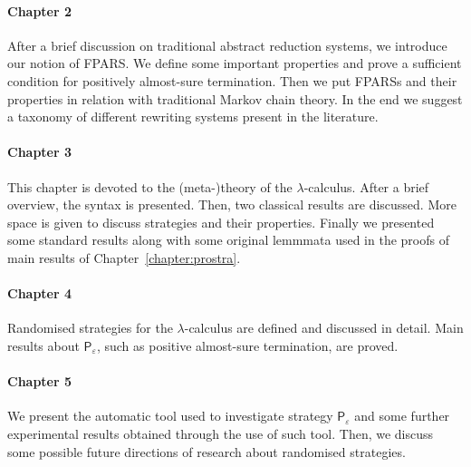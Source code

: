 \paragraph{Chapter 2} After a brief discussion on traditional abstract reduction systems, we introduce our notion of FPARS. We define some important properties and prove a sufficient condition for positively almost-sure termination. Then we put FPARSs and their properties in relation with traditional Markov chain theory. In the end we suggest a taxonomy of different rewriting systems present in the literature.
\paragraph{Chapter 3} This chapter is devoted to the (meta-)theory of the $\lambda$-calculus. After a brief overview, the syntax is presented. Then, two classical results are discussed. More space is given to discuss strategies and their properties. Finally we presented some standard results along with some original lemmmata used in the proofs of main results of Chapter~\ref{chapter:prostra}.
\paragraph{Chapter 4} Randomised strategies for the $\lambda$-calculus are defined and discussed in detail. Main results about $\mathsf{P}_\varepsilon$, such as positive almost-sure termination, are proved.
\paragraph{Chapter 5} We present the automatic tool used to investigate strategy $\mathsf{P}_\varepsilon$ and some further experimental results obtained through the use of such tool. Then, we discuss some possible future directions of research about randomised strategies.

